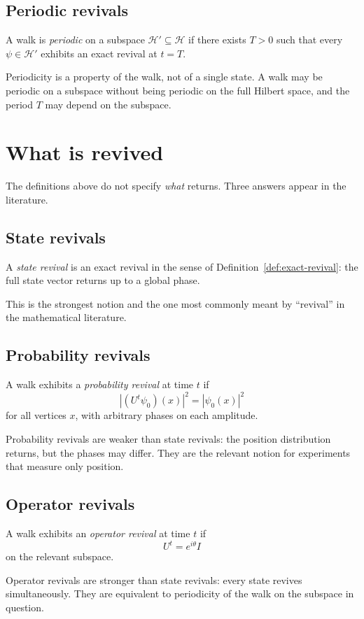 \subsection{Periodic revivals}
\begin{definition}\label{def:periodic-revival}
A walk is \emph{periodic} on a subspace $\mathcal{H}' \subseteq \mathcal{H}$
if there exists $T > 0$ such that every $\psi \in \mathcal{H}'$ exhibits an
exact revival at $t = T$.
\end{definition}
Periodicity is a property of the walk, not of a single state. A walk may be
periodic on a subspace without being periodic on the full Hilbert space,
and the period $T$ may depend on the subspace.

\section{What is revived}
The definitions above do not specify \emph{what} returns. Three answers
appear in the literature.

\subsection{State revivals}
\begin{definition}\label{def:state-revival}
A \emph{state revival} is an exact revival in the sense of
Definition~\ref{def:exact-revival}: the full state vector returns up to a
global phase.
\end{definition}
This is the strongest notion and the one most commonly meant by
``revival'' in the mathematical literature.

\subsection{Probability revivals}
\begin{definition}\label{def:probability-revival}
A walk exhibits a \emph{probability revival} at time $t$ if
\[
  |(U^t \psi_0)(x)|^2 = |\psi_0(x)|^2
\]
for all vertices $x$, with arbitrary phases on each amplitude.
\end{definition}
Probability revivals are weaker than state revivals: the position
distribution returns, but the phases may differ. They are the relevant
notion for experiments that measure only position.

\subsection{Operator revivals}
\begin{definition}\label{def:operator-revival}
A walk exhibits an \emph{operator revival} at time $t$ if
\[
  U^t = e^{i\theta} I
\]
on the relevant subspace.
\end{definition}
Operator revivals are stronger than state revivals: every state revives
simultaneously. They are equivalent to periodicity of the walk on the
subspace in question.

